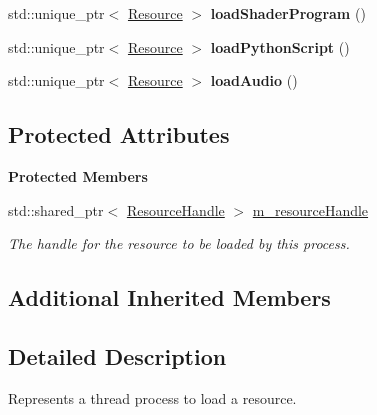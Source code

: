 \begin{Indent}
\begin{DoxyCompactItemize}
\item 
\mbox{\label{classrev_1_1_load_process_aef89e12de57bb85beef781dac32eba47}} 
std\+::unique\+\_\+ptr$<$ \mbox{\hyperlink{classrev_1_1_resource}{Resource}} $>$ {\bfseries load\+Shader\+Program} ()
\item 
\mbox{\label{classrev_1_1_load_process_a2a5bc4f3e6d2e647fc7843782cf24836}} 
std\+::unique\+\_\+ptr$<$ \mbox{\hyperlink{classrev_1_1_resource}{Resource}} $>$ {\bfseries load\+Python\+Script} ()
\item 
\mbox{\label{classrev_1_1_load_process_a5d358718fdd5f6ee8415a84be10040d3}} 
std\+::unique\+\_\+ptr$<$ \mbox{\hyperlink{classrev_1_1_resource}{Resource}} $>$ {\bfseries load\+Audio} ()
\end{DoxyCompactItemize}
\end{Indent}
\subsection*{Protected Attributes}
\begin{Indent}\textbf{ Protected Members}\par
\begin{DoxyCompactItemize}
\item 
\mbox{\label{classrev_1_1_load_process_a6e8edc25c3a30bd06fd787052aceeae6}} 
std\+::shared\+\_\+ptr$<$ \mbox{\hyperlink{classrev_1_1_resource_handle}{Resource\+Handle}} $>$ \mbox{\hyperlink{classrev_1_1_load_process_a6e8edc25c3a30bd06fd787052aceeae6}{m\+\_\+resource\+Handle}}
\begin{DoxyCompactList}\small\item\em The handle for the resource to be loaded by this process. \end{DoxyCompactList}\end{DoxyCompactItemize}
\end{Indent}
\subsection*{Additional Inherited Members}


\subsection{Detailed Description}
Represents a thread process to load a resource. 

